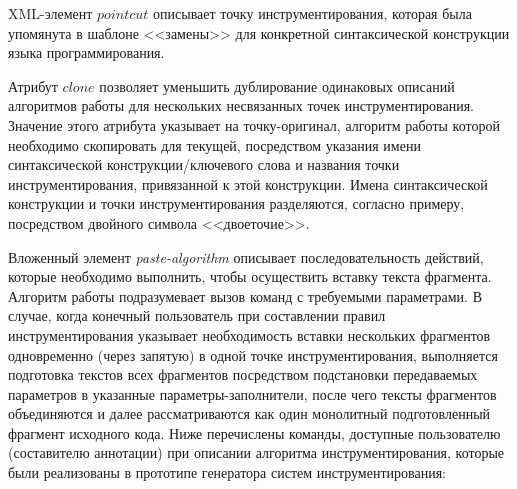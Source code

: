 XML-элемент $pointcut$ описывает точку инструментирования, которая была упомянута в шаблоне <<замены>> для конкретной синтаксической конструкции языка программирования.

Атрибут $clone$ позволяет уменьшить дублирование одинаковых описаний алгоритмов работы для нескольких несвязанных точек инструментирования.
Значение этого атрибута указывает на точку-оригинал, алгоритм работы которой необходимо скопировать для текущей, посредством указания имени синтаксической конструкции/ключевого слова и названия точки инструментирования, привязанной к этой конструкции.
Имена синтаксической конструкции и точки инструментирования разделяются, согласно примеру, посредством двойного символа <<двоеточие>>.

Вложенный элемент \textit{paste-algorithm} описывает последовательность действий, которые необходимо выполнить, чтобы осуществить вставку текста фрагмента.
Алгоритм работы подразумевает вызов команд с требуемыми параметрами.
В случае, когда конечный пользователь при составлении правил инструментирования указывает необходимость вставки нескольких фрагментов одновременно (через запятую) в одной точке инструментирования, выполняется подготовка текстов всех фрагментов посредством подстановки передаваемых параметров в указанные параметры-заполнители, после чего тексты фрагментов объединяются и далее рассматриваются как один монолитный подготовленный фрагмент исходного кода.
Ниже перечислены команды, доступные пользователю (составителю аннотации) при описании алгоритма инструментирования, которые были реализованы в прототипе генератора систем инструментирования:

